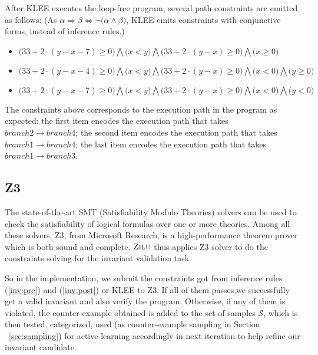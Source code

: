 After KLEE executes the loop-free program,
several path constraints are emitted as follows:
(As $\alpha \Rightarrow \beta \Longleftrightarrow \neg \big(\alpha \wedge \beta\big)$, 
KLEE emits constraints with conjunctive forms, instead of inference rules.)

\begin{itemize}
\item $\big(33+2\cdot(y-x-7)\ge0\big) \bigwedge \big(x<y\big) \bigwedge \big(33+2\cdot(y-x)\ge0\big) \bigwedge \big(x\ge0\big)$
\item $\big(33+2\cdot(y-x-4)\ge0\big) \bigwedge \big(x<y\big) \bigwedge \big(33+2\cdot(y-x)\ge0\big) \bigwedge \big(x<0\big) \bigwedge \big(y\ge0\big)$
\item $\big(33+2\cdot(y-x-7)\ge0\big) \bigwedge \big(x<y\big) \bigwedge \big(33+2\cdot(y-x)\ge0\big) \bigwedge \big(x<0\big) \bigwedge \big(y<0\big)$
\end{itemize}

The constraints above corresponds to the execution path in the program as expected:
the first item encodes the execution path that takes $branch2 \to branch4$;
the second item encodes the execution path that takes $branch1 \to branch4$;
the last item encodes the execution path that takes $branch1 \to branch3$.


\subsection{Z3}
\label{subsec:z3}
The state-of-the-art SMT (Satisfiability Modulo Theories)\cite{barrett2009satisfiability}  solvers can be used to 
check the satisfiability of logical formulas over one or more theories. 
Among all these solvers, Z3\cite{de2008z3}, from Microsoft Research, is a high-performance theorem prover which is both sound and complete.
$\textsc{Zilu}$ thus applies Z3 solver to do the constraints solving for the invariant validation task. 

So in the implementation, we submit the constraints got from inference rules (\ref{inv:pre}) and (\ref{inv:post}) or KLEE to Z3.
If all of them passes,we successfully get a valid invariant and also verify the program. 
Otherwise, if any of them is violated, the counter-example obtained is added to the set of samples $\mathcal{S}$, 
which is then tested, categorized, used (as counter-example sampling in Section ~\ref{sec:sampling}) for active learning accordingly 
in next iteration to help refine our invariant candidate.

